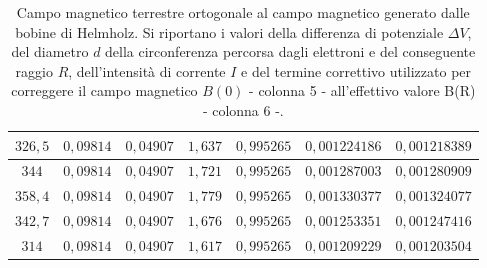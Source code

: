 \documentclass[]{article}
\begin{document}
\begin{table}
\begin{tabular}{||c|c|c|c|c|c|c||}
        $326,5$ & $0,09814$ & $0,04907 $ & $1,637$ & $0,995265$ & $0,001224186$ & $0,001218389$ \\\hline
        $344  $ & $0,09814$ & $0,04907 $ & $1,721$ & $0,995265$ & $0,001287003$ & $0,001280909$ \\\hline
        $358,4$ & $0,09814$ & $0,04907 $ & $1,779$ & $0,995265$ & $0,001330377$ & $0,001324077$ \\\hline
        $342,7$ & $0,09814$ & $0,04907 $ & $1,676$ & $0,995265$ & $0,001253351$ & $0,001247416$ \\\hline
        $314  $ & $0,09814$ & $0,04907 $ & $1,617$ & $0,995265$ & $0,001209229$ & $0,001203504$ \\\hline
    
    \end{tabular}
    \caption{Campo magnetico terrestre ortogonale al campo magnetico generato dalle bobine di Helmholz. Si riportano i valori della differenza di potenziale $\Delta V$, del diametro $ d $ della circonferenza percorsa dagli elettroni e del conseguente raggio $ R $, dell'intensità di corrente $ I $ e del termine correttivo utilizzato per correggere il campo magnetico $B(0)$ - colonna 5 - all'effettivo valore B(R) - colonna 6 -.}
    \label{CM_ortogonale}
\end{table}
\end{document}
